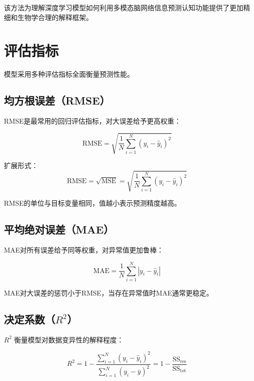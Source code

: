 该方法为理解深度学习模型如何利用多模态脑网络信息预测认知功能提供了更加精细和生物学合理的解释框架。

\newpage

\section{评估指标}

模型采用多种评估指标全面衡量预测性能。

\subsection{均方根误差（RMSE）}

RMSE是最常用的回归评估指标，对大误差给予更高权重：

\begin{equation}
\text{RMSE} = \sqrt{ \frac{1}{N} \sum_{i=1}^{N} (y_i - \hat{y}_i)^2 }
\end{equation}

扩展形式：
\begin{equation}
\text{RMSE} = \sqrt{ \text{MSE} } = \sqrt{ \frac{1}{N} \sum_{i=1}^{N} (y_i - \hat{y}_i)^2 }
\end{equation}

RMSE的单位与目标变量相同，值越小表示预测精度越高。

\subsection{平均绝对误差（MAE）}

MAE对所有误差给予同等权重，对异常值更加鲁棒：

\begin{equation}
\text{MAE} = \frac{1}{N} \sum_{i=1}^{N} | y_i - \hat{y}_i |
\end{equation}

MAE对大误差的惩罚小于RMSE，当存在异常值时MAE通常更稳定。

\subsection{决定系数（$R^2$）}

$R^2$ 衡量模型对数据变异性的解释程度：

\begin{equation}
R^2 = 1 - \frac{\sum_{i=1}^{N} (y_i - \hat{y}_i)^2}{\sum_{i=1}^{N} (y_i - \bar{y})^2} = 1 - \frac{\text{SS}_{\text{res}}}{\text{SS}_{\text{tot}}}
\end{equation}

